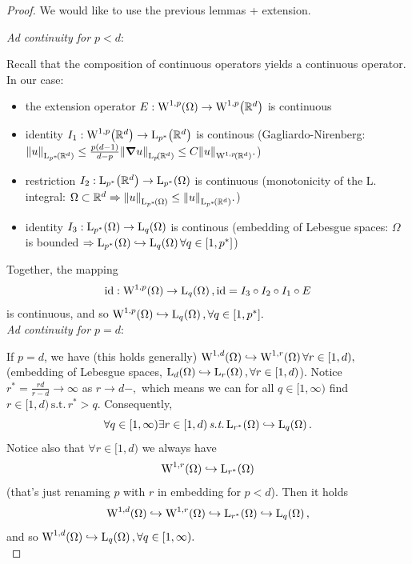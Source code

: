 \documentclass{article}
\begin{document}
	\begin{proof}
	We would like to use the previous lemmas + extension. 


	\textit{Ad continuity for $p<d$}:

	Recall that the composition of continuous operators yields a continuous operator. In our case:
	\begin{itemize}
		\item the extension operator $E:\WkpSet[1][p]{\Omega} \to \WkpSet[1][p]{\R^d}$ is continuous
		\item identity $I_1:\WkpSet[1][p]{\R^d}\to \LpSet[p^{*}]{\R^d}$ is continous (Gagliardo-Nirenberg: $\norm{u}_{\LpSet[p^{*}]{\R^{d}}}\leq \frac{p(d-1)}{d-p}\norm{\grad u}_{\LpSet[p]{\R^{d}}} \leq C \norm{u}_{\WkpSet[1][p]{\R^{d}}}.$)
		\item restriction $I_2: \LpSet[p^{*}]{\R^d}\to \LpSet[p^{*}]{\Omega}$ is continuous (monotonicity of the L. integral: $\Omega \subset \R^{d} \Rightarrow \norm{u}_{\LpSet[p^{*}]{\Omega}} \leq \norm{u}_{\LpSet[p^{*}]{\R^{d}}}.$)
		\item identity $I_3: \LpSet[p^{*}]{\Omega} \to \LpSet[q]{\Omega}$ is continous (embedding of Lebesgue spaces: $\Omega$ is bounded $\Rightarrow \LpSet[p^{*}]{\Omega} \hookrightarrow \LpSet[q]{\Omega} \forall q \in [1,p^{*}]$)
	\end{itemize}
	Together, the mapping
	\[
		\text{id}:\WkpSet[1][p]{\Omega} \to \LpSet[q]{\Omega}, \text{id}=I_3 \circ I_2 \circ I_1 \circ E
	\]
	is continuous, and so $\WkpSet[1][p]{\Omega} \hookrightarrow \LpSet[q]{\Omega}, \forall q \in [1, p^{*}].$\\


	\textit{Ad continuity for $p =d$}:

	If $p=d$, we have (this holds generally)  $\WkpSet[1][d]{\Omega} \hookrightarrow \WkpSet[1][r]{\Omega} \forall r \in [1,d),$ (embedding of Lebesgue spaces, $\LpSet[d]{\Omega}\hookrightarrow \LpSet[r]{\Omega}, \forall r \in [1,d)$). Notice $r^{*} = \frac{r d}{r-d} \to \infty$ as $r\to d-,$ which means we can for all $q \in [1,\infty)$ find $r \in [1,d) \, \text{s.t.} \, r^{*} >q.$ Consequently,
	\[
		\forall q \in [1,\infty) \exists r \in [1,d) \, \text{\textit{s.t.}} \, \LpSet[r^{*}]{\Omega} \hookrightarrow \LpSet[q]{\Omega}.
	\]
	Notice also that $\forall r \in [1,d)$ we always have
	\[
		\WkpSet[1][r]{\Omega} \hookrightarrow \LpSet[r^{*}]{\Omega}
	\]
	(that's just renaming $p$ with $r$ in embedding for $p<d$). Then it holds
	\[
		\WkpSet[1][d]{\Omega} \hookrightarrow \WkpSet[1][r]{\Omega} \hookrightarrow \LpSet[r^{*}]{\Omega} \hookrightarrow \LpSet[q]{\Omega},
	\]
	and so $\WkpSet[1][d]{\Omega} \hookrightarrow \LpSet[q]{\Omega}, \forall q \in [1,\infty).$\\


\end{proof}
\end{document}
